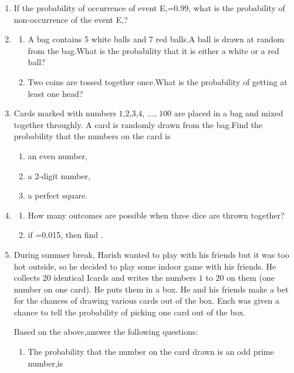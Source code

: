 \begin{enumerate}[label=\thesection.\arabic*.,ref=\thesection.\theenumi]
\begin{enumerate}[label=(\alph*)]
\end{enumerate}
\item  If the probability of occurrence of event E,=0.99, what is the probability of non-occurrence of the event E,?                   \item \begin{enumerate}[label=(\alph*)]
\item A bag contains 5 white balls and 7 red balls.A ball is drawn at random from the bag.What is the probability that it is either a white or a red ball?
\item Two coins are tossed together once.What is the probability of getting at least one head?
\end{enumerate}
\item Cards marked with numbers $1$,$2$,$3$,$4$, ..., $100$ are placed in a bag and mixed together throughly. A card is randomly drawn from the bag.Find the probability that the numbers on the card is                             \begin{enumerate}[label=(\roman*)]                                                                                                                     \item an even number,
\item a $2$-digit number,
\item a perfect square.                                         
\end{enumerate}
\item \begin{enumerate}[label=(\alph*)] 
\item How many outcomes are possible when three dice are thrown together?
\item if =0.015, then find .
\end{enumerate}
\item  During summer break, Harish wanted to play with his friends but it was too hot outside, so he decided to play some indoor game with his friends. He collects $20$ identical Icards and writes the numbers $1$ to $20$ on them (one number on one card). He puts them in a box. He and his friends make a bet for the chances of drawing various cards out of the box. Ench was given a chance to tell the probability of picking one card out of the box.

Based on the above,answer the following questions:
\begin{enumerate}[label=(\roman*)]                                                                                                                                  \item The probability that the number on the card drawn is an odd prime number,is
\begin{enumerate}[label=(\Alph*)]                            


\end{enumerate}
\end{enumerate}
\end{enumerate}
